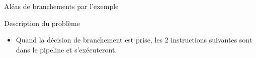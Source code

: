 %
\begin{Frame}{Aléas de branchements par l'exemple}

\begin{block}{Description du problème}
       \begin{center}
 	\begin{itemize}
          \item Quand la décision de branchement est prise, les 2 instructions suivantes sont dans le pipeline et s'exécuteront.
        \end{itemize}
       \end{center}
      \end{block}   

\vspace{-0.1cm}
        \begin{center}
        \end{center}
 


\end{Frame}


